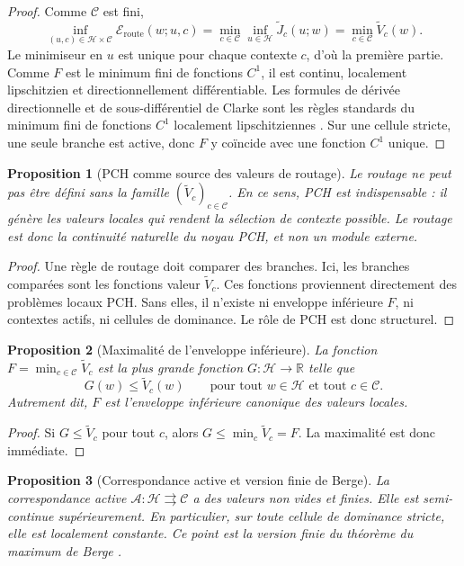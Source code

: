 \documentclass[11pt,a4paper]{article}
\newtheorem{proposition}{Proposition}[section]
\newcommand{\R}{\mathbb R}
\newcommand{\Hh}{\mathcal H}
\newcommand{\Ccal}{\mathcal C}
\newcommand{\Acal}{\mathcal A}
\begin{document}
\begin{proof}
Comme \(\Ccal\) est fini,
\[
\inf_{(u,c)\in\Hh\times\Ccal}\mathcal E_{\mathrm{route}}(w;u,c)
=
\min_{c\in\Ccal}\inf_{u\in\Hh}\widetilde J_c(u;w)
=
\min_{c\in\Ccal}\widetilde V_c(w).
\]
Le minimiseur en \(u\) est unique pour chaque contexte \(c\), d'où la première partie. Comme \(F\) est le minimum fini de fonctions \(C^1\), il est continu, localement lipschitzien et directionnellement différentiable. Les formules de dérivée directionnelle et de sous-différentiel de Clarke sont les règles standards du minimum fini de fonctions \(C^1\) localement lipschitziennes \cite{Clarke1983}. Sur une cellule stricte, une seule branche est active, donc \(F\) y coïncide avec une fonction \(C^1\) unique.
\end{proof}

\begin{proposition}[PCH comme source des valeurs de routage]
Le routage ne peut pas être défini sans la famille \((\widetilde V_c)_{c\in\Ccal}\). En ce sens, PCH est indispensable : il génère les valeurs locales qui rendent la sélection de contexte possible. Le routage est donc la continuité naturelle du noyau PCH, et non un module externe.
\end{proposition}

\begin{proof}
Une règle de routage doit comparer des branches. Ici, les branches comparées sont les fonctions valeur \(\widetilde V_c\). Ces fonctions proviennent directement des problèmes locaux PCH. Sans elles, il n'existe ni enveloppe inférieure \(F\), ni contextes actifs, ni cellules de dominance. Le rôle de PCH est donc structurel.
\end{proof}

\begin{proposition}[Maximalité de l'enveloppe inférieure]
La fonction \(F=\min_{c\in\Ccal}\widetilde V_c\) est la plus grande fonction \(G:\Hh\to\R\) telle que
\[
G(w)\le \widetilde V_c(w)\qquad\text{pour tout }w\in\Hh\text{ et tout }c\in\Ccal.
\]
Autrement dit, \(F\) est l'enveloppe inférieure canonique des valeurs locales.
\end{proposition}

\begin{proof}
Si \(G\le \widetilde V_c\) pour tout \(c\), alors \(G\le \min_c \widetilde V_c=F\). La maximalité est donc immédiate.
\end{proof}

\begin{proposition}[Correspondance active et version finie de Berge]
La correspondance active \(\Acal:\Hh\rightrightarrows\Ccal\) a des valeurs non vides et finies. Elle est semi-continue supérieurement. En particulier, sur toute cellule de dominance stricte, elle est localement constante. Ce point est la version finie du théorème du maximum de Berge \cite{Berge1963}.
\end{proposition}
\end{document}

